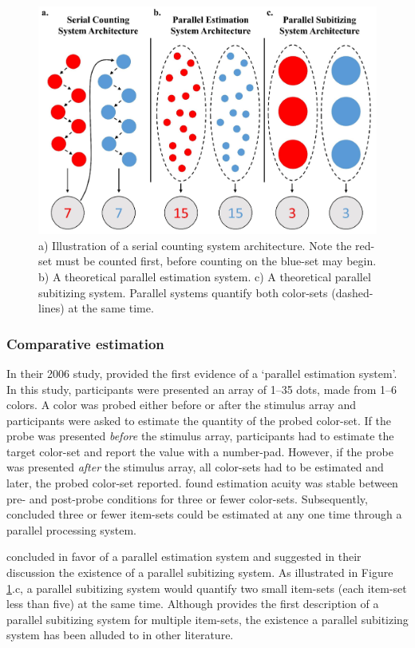 \begin{figure}[tbh]
\centering \includegraphics[scale = .65]{Figures/Intro/CountEstSub.pdf}
\caption{a) Illustration of a serial counting system architecture. Note the red-set must be counted first, before counting on the blue-set may begin. b) A theoretical parallel estimation system. c) A theoretical parallel subitizing system. Parallel systems quantify both color-sets (dashed-lines) at the same time.}
\label{fig:Ch1_CountEstSub}
\end{figure}

\subsubsection{Comparative estimation}
In their 2006 study, \citeauthor{HALBERDA_2006} provided the first evidence of a `parallel estimation system'. In this study, participants were presented an array of 1--35 dots, made from 1--6 colors. A color was probed either before or after the stimulus array and participants were asked to estimate the quantity of the probed color-set. If the probe was presented \emph{before} the stimulus array, participants had to estimate the target color-set and report the value with a number-pad. However, if the probe was presented \textit{after} the stimulus array, all color-sets had to be estimated and later, the probed color-set reported. \citeauthor{HALBERDA_2006} found estimation acuity was stable between pre- and post-probe conditions for three or fewer color-sets. Subsequently, \citeauthor{HALBERDA_2006} concluded three or fewer item-sets could be estimated at any one time through a parallel processing system. 

 concluded in favor of a parallel estimation system and suggested in their discussion the existence of a parallel subitizing system. As illustrated in Figure \ref{fig:Ch1_CountEstSub}.c, a parallel subitizing system would quantify two small item-sets (each item-set less than five) at the same time. Although  provides the first description of a parallel subitizing system for multiple item-sets, the existence a parallel subitizing system has been alluded to in other literature.

